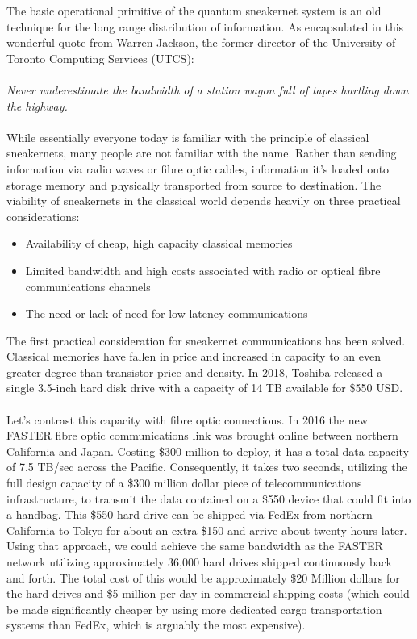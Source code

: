 \documentclass[aps,prl,twocolumn,10pt,nofootinbib]{revtex4}
\begin{document}
The basic operational primitive of the quantum sneakernet system is an old technique for the long range distribution of information.  As encapsulated in this wonderful quote from Warren Jackson, the former director of the University of Toronto Computing Services (UTCS):
\\
\\
{\em Never underestimate the bandwidth of a station wagon full of tapes hurtling down the highway.}
\\
\\
While essentially everyone today is familiar with the principle of classical sneakernets, many people are not familiar with the name. Rather than sending information via radio waves or fibre optic cables, information it's loaded onto storage memory and physically transported from source to destination.  The viability of sneakernets in the classical world depends heavily on three practical considerations:
\begin{itemize}
\item Availability of cheap, high capacity classical memories
\item Limited bandwidth and high costs associated with radio or optical fibre communications channels
\item The need or lack of need for low latency communications 
\end{itemize}
The first practical consideration for sneakernet communications has been solved.  Classical memories have fallen in price and increased in capacity to an even greater degree than transistor price and density.  In 2018, Toshiba released a single 3.5-inch hard disk drive with a capacity of 14 TB available for \$550 USD.  
\\
\\
Let's contrast this capacity with fibre optic connections.  In 2016 the new FASTER fibre optic communications link was brought online between northern California and Japan.  Costing \$300 million to deploy, it has a total data capacity of 7.5 TB/sec across the Pacific.  Consequently, it takes two seconds, utilizing the full design capacity of a \$300 million dollar piece of telecommunications infrastructure, to transmit the data contained on a \$550 device that could fit into a handbag. This \$550 hard drive can be shipped via FedEx from northern California to Tokyo for about an extra \$150 and arrive about twenty hours later. Using that approach, we could achieve the same bandwidth as the FASTER network utilizing approximately 36,000 hard drives shipped continuously back and forth.  The total cost of this would be approximately \$20 Million dollars for the hard-drives and \$5 million per day in commercial shipping costs (which could be made significantly cheaper by using more dedicated cargo transportation systems than FedEx, which is arguably the most expensive).
\end{document}
